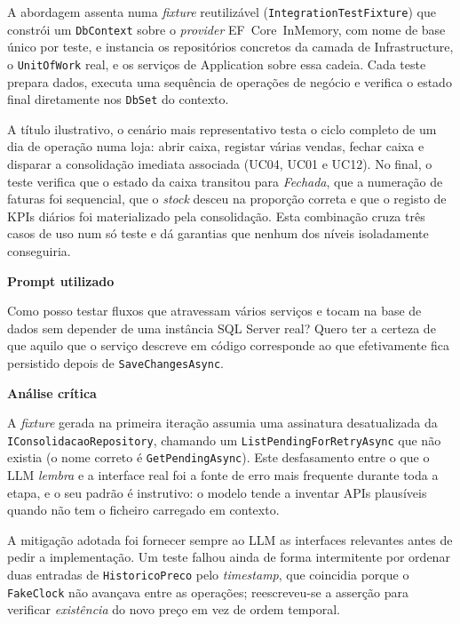     A abordagem assenta numa \textit{fixture} reutilizável (\texttt{IntegrationTestFixture}) que constrói um \texttt{DbContext} sobre o \textit{provider} EF~Core~InMemory, com nome de base único por teste, e instancia os repositórios concretos da camada de Infrastructure, o \texttt{UnitOfWork} real, e os serviços de Application sobre essa cadeia. Cada teste prepara dados, executa uma sequência de operações de negócio e verifica o estado final diretamente nos \texttt{DbSet} do contexto.

    A título ilustrativo, o cenário mais representativo testa o ciclo completo de um dia de operação numa loja: abrir caixa, registar várias vendas, fechar caixa e disparar a consolidação imediata associada (UC04, UC01 e UC12). No final, o teste verifica que o estado da caixa transitou para \textit{Fechada}, que a numeração de faturas foi sequencial, que o \textit{stock} desceu na proporção correta e que o registo de KPIs diários foi materializado pela consolidação. Esta combinação cruza três casos de uso num só teste e dá garantias que nenhum dos níveis isoladamente conseguiria.

    \begin{tcolorbox}[title=Interação com o LLM]
    \textbf{Prompt utilizado}

    Como posso testar fluxos que atravessam vários serviços e tocam na base de dados sem depender de uma instância SQL Server real? Quero ter a certeza de que aquilo que o serviço descreve em código corresponde ao que efetivamente fica persistido depois de \texttt{SaveChangesAsync}.

    \tcblower

    \textbf{Análise crítica}

    A \textit{fixture} gerada na primeira iteração assumia uma assinatura desatualizada da \texttt{IConsolidacaoRepository}, chamando um \texttt{ListPendingForRetryAsync} que não existia (o nome correto é \texttt{GetPendingAsync}). Este desfasamento entre o que o LLM \textit{lembra} e a interface real foi a fonte de erro mais frequente durante toda a etapa, e o seu padrão é instrutivo: o modelo tende a inventar APIs plausíveis quando não tem o ficheiro carregado em contexto.

    A mitigação adotada foi fornecer sempre ao LLM as interfaces relevantes antes de pedir a implementação. Um teste falhou ainda de forma intermitente por ordenar duas entradas de \texttt{HistoricoPreco} pelo \textit{timestamp}, que coincidia porque o \texttt{FakeClock} não avançava entre as operações; reescreveu-se a asserção para verificar \textit{existência} do novo preço em vez de ordem temporal.
    \end{tcolorbox}

